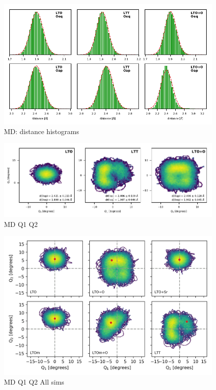 \begin{figure}
	\centering
	\includegraphics[width=\textwidth]{fig/md/dist_hist.pdf}
	\caption[MD: distance histograms]{MD: distance histograms}
	\label{fig:md_distances}
\end{figure}

\begin{figure}
	\centering
	\includegraphics[width=\textwidth]{fig/md/prm_q1q2.pdf}
	\caption[MD Q1 Q2]{MD Q1 Q2}
	\label{fig:md_q1_q2}
\end{figure}

\begin{figure}
	\centering
	\includegraphics[width=\textwidth]{fig/md/Q1_Q2_all.png}
	\caption[MD Q1 Q2 All sims]{MD Q1 Q2 All sims}
	\label{fig:md_q1_q2_all}
\end{figure}


